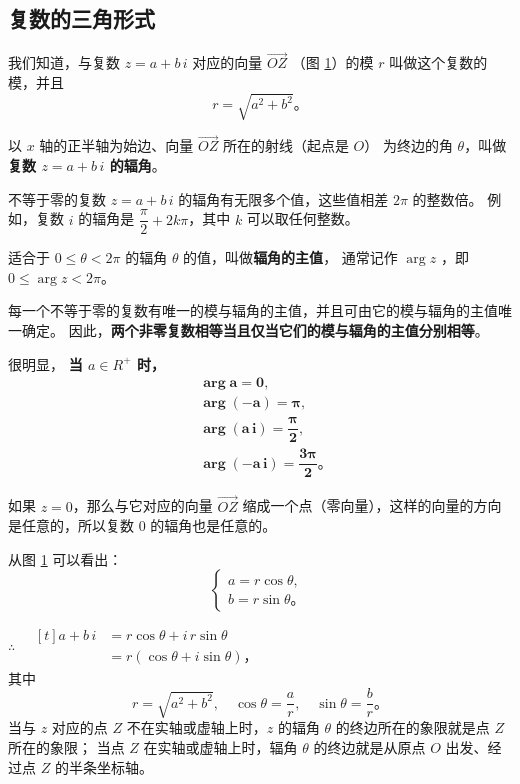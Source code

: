 \subsection{复数的三角形式}\label{subsec:5-6}

我们知道，与复数 $z = a + b\,i$ 对应的向量 $\overrightarrow{OZ}$ （图 \ref{fig:5-9}）的模 $r$ 叫做这个复数的模，并且
$$ r = \sqrt{a^2 + b^2} \text{。} $$

\begin{figure}[htbp]
    \centering
    
    \caption{}\label{fig:5-9}
\end{figure}

以 $x$ 轴的正半轴为始边、向量 $\overrightarrow{OZ}$ 所在的射线（起点是 $O$）
为终边的角 $\theta$，叫做\textbf{复数 $z = a + b\,i$ 的辐角}。

不等于零的复数 $z = a + b\,i$ 的辐角有无限多个值，这些值相差 $2\pi$ 的整数倍。
例如，复数 $i$ 的辐角是 $\dfrac{\pi}{2} + 2k\pi$，其中 $k$ 可以取任何整数。

适合于 $0 \leqslant \theta < 2\pi$ 的辐角 $\theta$ 的值，叫做\textbf{辐角的主值}，
通常记作 $\arg z$ ，即 $0 \leqslant \arg z < 2\pi$。

每一个不等于零的复数有唯一的模与辐角的主值，并且可由它的模与辐角的主值唯一确定。
因此，\textbf{两个非零复数相等当且仅当它们的模与辐角的主值分别相等}。

很明显， \textbf{当 $a \in R^+$ 时，}
\begin{align*}
    & \bm{\arg a = 0,} \\
    & \bm{\arg(-a) = \pi,} \\
    & \bm{\arg(a\,i) = \dfrac{\pi}{2},} \\
    & \bm{\arg(-a\,i) = \dfrac{3\pi}{2} \text{。}}
\end{align*}

如果 $z = 0$，那么与它对应的向量 $\overrightarrow{OZ}$ 缩成一个点（零向量），这样的向量的方向是任意的，所以复数 $0$ 的辐角也是任意的。

从图 \ref{fig:5-9} 可以看出：
$$\begin{cases}
    a = r \cos\theta, \\
    b = r \sin\theta \text{。}
\end{cases}$$

$\therefore \quad \begin{aligned}[t]
    a + b\,i &= r\cos\theta + i\,r\sin\theta \\
        &= r(\cos\theta + i\sin\theta) \text{，}
\end{aligned}$\\
其中
$$ r = \sqrt{a^2 + b^2},\quad \cos\theta = \dfrac{a}{r},\quad \sin\theta = \dfrac{b}{r} \text{。} $$
当与 $z$ 对应的点 $Z$ 不在实轴或虚轴上时，$z$ 的辐角 $\theta$ 的终边所在的象限就是点 $Z$ 所在的象限；
当点 $Z$ 在实轴或虚轴上时，辐角 $\theta$ 的终边就是从原点 $O$ 出发、经过点 $Z$ 的半条坐标轴。


